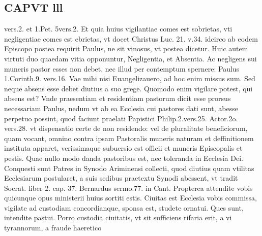 \documentclass{article}
\begin{document}
\begin{pages}
\section*{CAPVT  lll }
\marginpar{[ p.119 ]}\pstart vers.2. et 1.Pet. 5vers.2. Et quia huius vigilantiae comes est sobrietas, vti negligentiae comes est ebrietas, vt docet Christus Luc. 21. v.34. idcirco ab eodem Episcopo postea requirit Paulus, ne sit vinosus, vt postea dicetur. Huic autem virtuti duo quaedam vitia opponuntur, Negligentia, et Absentia. Ac negligens sui muneris pastor esses non debet, nec illud per contemptum spernere: Paulus 1.Corinth.9. vers.16. Vae mihi nisi Euangelizauero, ad hoc enim missus sum. Sed neque absens esse debet diutius a suo grege. Quomodo enim vigilare potest, qui absens est? Vnde praesentiam et residentiam pastorum dicit esse prorsus necessariam Paulus, nedum vt ab ea Ecclesia cui pastores dati sunt, abesse perpetuo possint, quod faciunt praelati Papistici Philip.2.vers.25. Actor.2o. vers.28. vt dispensatio certe de non residendo: vel de pluralitate beneficiorum, quam vocant, omnino contra ipsam Pastoralis muneris naturam et deffinitionem instituta apparet, verissimaque subuersio est officii et muneris Episcopalis et pestis. Quae nullo modo danda pastoribus est, nec toleranda in Ecclesia Dei. Conquesti sunt Patres in Synodo Ariminensi collecti, quod diutius quam vtilitas Ecclesiarum postularet, a suis sedibus praetextu Synodi abessent, vt tradit Socrat. liber 2. cap. 37. Bernardus sermo.77. in Cant. Propterea attendite vobis quicunque opus ministerii huius sortiti estis. Ciuitas est Ecclesia vobis commissa, vigilate ad custodiam concordianque, sponsa est, studete ornatui. Ques sunt, intendite pastui. Porro custodia ciuitatis, vt sit sufficiens rifaria erit, a vi tyrannorum, a fraude haeretico\pend

\end{pages}
\end{document}
